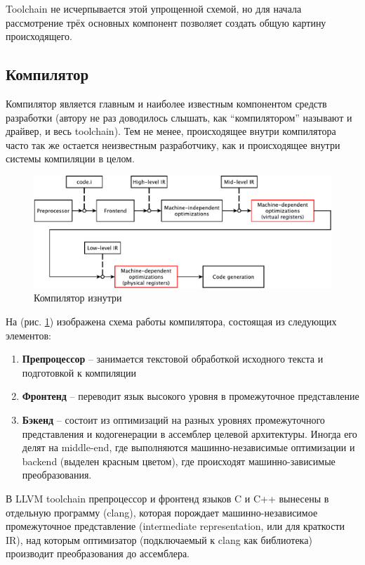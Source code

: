 \documentclass[a4paper,12pt,oneside]{article}
\begin{document}
Toolchain не исчерпывается этой упрощенной схемой, но для начала рассмотрение трёх основных компонент позволяет создать общую картину происходящего.

\pagebreak
\subsection{Компилятор}\label{subsec:Compiler}

Компилятор является главным и наиболее известным компонентом средств разработки (автору не раз доводилось слышать, как ``компилятором'' называют и драйвер, и весь toolchain). Тем не менее, происходящее внутри компилятора часто так же остается неизвестным разработчику, как и происходящее внутри системы компиляции в целом.

\begin{figure}[ht]
\centering
\includegraphics[width=1.0\textwidth]{illustrations/compiler-crop.pdf}
\caption{Компилятор изнутри}
\label{fig:compiler_scheme}
\end{figure}

На (рис. \ref{fig:compiler_scheme}) изображена схема работы компилятора, состоящая из следующих элементов:

\begin{enumerate}
\item \textbf{Препроцессор} -- занимается текстовой обработкой исходного текста и подготовкой к компиляции
\item \textbf{Фронтенд} -- переводит язык высокого уровня в промежуточное представление
\item \textbf{Бэкенд} -- состоит из оптимизаций на разных уровнях промежуточного представления и кодогенерации в ассемблер целевой архитектуры. Иногда его делят на middle-end, где выполняются машинно-независимые оптимизации и backend (выделен красным цветом), где происходят машинно-зависимые преобразования.
\end{enumerate}

В LLVM toolchain препроцессор и фронтенд языков C и C++ вынесены в отдельную программу (clang), которая порождает машинно-независимое промежуточное представление (intermediate representation, или для краткости IR), над которым оптимизатор (подключаемый к clang как библиотека) производит преобразования до ассемблера. 
\end{document}
